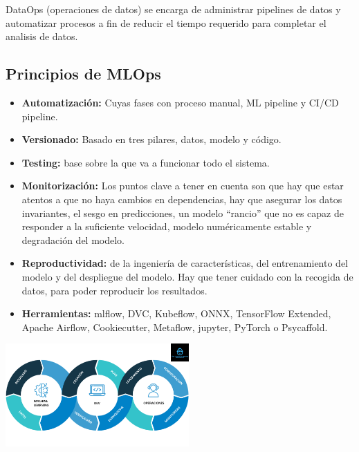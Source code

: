\documentclass[twoside,twocolumn]{article}
\begin{document}
DataOps (operaciones de datos) se encarga de administrar pipelines de datos y automatizar procesos a fin de reducir el tiempo requerido para completar el analisis de datos.

\subsection{Principios de MLOps}
\begin{itemize}
    \item \textbf{Automatización:} Cuyas fases con proceso manual, ML pipeline y CI/CD pipeline.
    \item \textbf{Versionado:} Basado en tres pilares, datos, modelo y código.
    \item \textbf{Testing:} base sobre la que va a funcionar todo el sistema.
    \item \textbf{Monitorización:} Los puntos clave a tener en cuenta son que hay que estar atentos a que no haya cambios en dependencias, hay que asegurar los datos invariantes, el sesgo en predicciones, un modelo “rancio” que no es capaz de responder a la suficiente velocidad, modelo numéricamente estable y degradación del modelo.
    \item \textbf{Reproductividad:} de la ingeniería de características, del entrenamiento del modelo y del despliegue del modelo. Hay que tener cuidado con la recogida de datos, para poder reproducir los resultados.
    \item \textbf{Herramientas:} mlflow, DVC, Kubeflow, ONNX, TensorFlow Extended, Apache Airflow, Cookiecutter, Metaflow, jupyter, PyTorch o Psycaffold.    
\end{itemize}
\begin{center}
    \includegraphics[width=7cm]{./img/img4.png}
\end{center}


\end{document}
